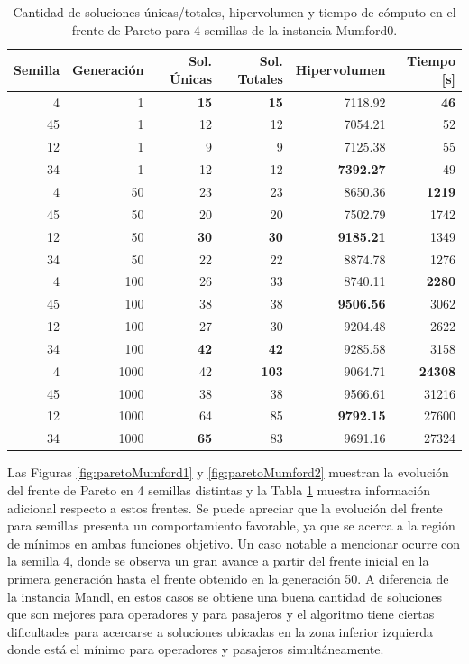 \begin{table}[!htb]
\centering
\begin{tabular}{|r|r|r|r|r|r|}
\hline
Semilla & Generación & Sol. Únicas & Sol. Totales & Hipervolumen & Tiempo [s]\\  
\hline \hline
4 & 1 & \textbf{15} & \textbf{15} & 7118.92 & \textbf{46} \\ \hline
45 & 1 & 12 & 12 & 7054.21 & 52 \\ \hline
12 & 1 & 9 & 9 & 7125.38 & 55 \\ \hline
34 & 1 & 12 & 12 & \textbf{7392.27} & 49 \\ \hline\hline
4 & 50 & 23 & 23 & 8650.36 & \textbf{1219} \\ \hline
45 & 50 & 20 & 20 & 7502.79 & 1742 \\ \hline
12 & 50 & \textbf{30} & \textbf{30} & \textbf{9185.21} & 1349 \\ \hline
34 & 50 & 22 & 22 & 8874.78 & 1276 \\ \hline\hline
4 & 100 & 26 & 33 & 8740.11 & \textbf{2280} \\ \hline
45 & 100 & 38 & 38 & \textbf{9506.56} & 3062 \\ \hline
12 & 100 & 27 & 30 & 9204.48 & 2622 \\ \hline
34 & 100 & \textbf{42} & \textbf{42} & 9285.58 & 3158 \\ \hline\hline
4 & 1000 & 42 & \textbf{103} & 9064.71 & \textbf{24308} \\ \hline
45 & 1000 & 38 & 38 & 9566.61 & 31216 \\ \hline
12 & 1000 & 64 & 85 & \textbf{9792.15} & 27600 \\ \hline
34 & 1000 & \textbf{65} & 83 & 9691.16 & 27324 \\ \hline\hline
\end{tabular}
\caption{Cantidad de soluciones únicas/totales, hipervolumen y tiempo de cómputo en el frente de Pareto para 4 semillas de la instancia Mumford0.}
\label{tab:dataFrenteMumford0}
\end{table}

Las Figuras \ref{fig:paretoMumford1} y \ref{fig:paretoMumford2} muestran la evolución del frente de Pareto en 4 semillas distintas y la Tabla \ref{tab:dataFrenteMumford0} muestra información adicional respecto a estos frentes. Se puede apreciar que la evolución del frente para semillas presenta un comportamiento favorable, ya que se acerca a la región de mínimos en ambas funciones objetivo. Un caso notable a mencionar ocurre con la semilla 4, donde se observa un gran avance a partir del frente inicial en la primera generación hasta el frente obtenido en la generación 50. A diferencia de la instancia Mandl, en estos casos se obtiene una buena cantidad de soluciones que son mejores para operadores y para pasajeros y el algoritmo tiene ciertas dificultades para acercarse a soluciones ubicadas en la zona inferior izquierda donde está el mínimo para operadores y pasajeros simultáneamente.

